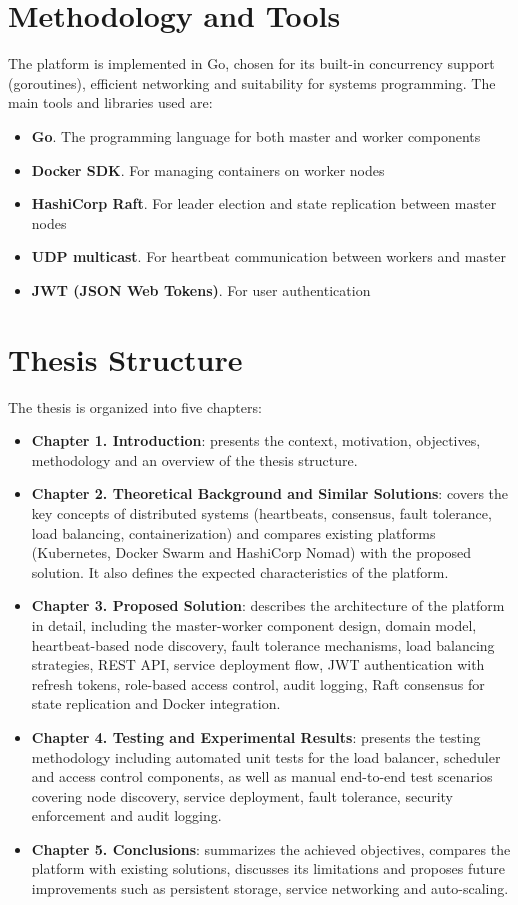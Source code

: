 \section{Methodology and Tools}

The platform is implemented in Go, chosen for its built-in concurrency support (goroutines), efficient networking and suitability for systems programming. The main tools and libraries used are:

\begin{itemize}
    \item \textbf{Go}. The programming language for both master and worker components
    \item \textbf{Docker SDK}. For managing containers on worker nodes
    \item \textbf{HashiCorp Raft}. For leader election and state replication between master nodes
    \item \textbf{UDP multicast}. For heartbeat communication between workers and master
    \item \textbf{JWT (JSON Web Tokens)}. For user authentication
\end{itemize}

\section{Thesis Structure}

The thesis is organized into five chapters:

\begin{itemize}
    \item \textbf{Chapter 1. Introduction}: presents the context, motivation, objectives, methodology and an overview of the thesis structure.
    \item \textbf{Chapter 2. Theoretical Background and Similar Solutions}: covers the key concepts of distributed systems (heartbeats, consensus, fault tolerance, load balancing, containerization) and compares existing platforms (Kubernetes, Docker Swarm and HashiCorp Nomad) with the proposed solution. It also defines the expected characteristics of the platform.
    \item \textbf{Chapter 3. Proposed Solution}: describes the architecture of the platform in detail, including the master-worker component design, domain model, heartbeat-based node discovery, fault tolerance mechanisms, load balancing strategies, REST API, service deployment flow, JWT authentication with refresh tokens, role-based access control, audit logging, Raft consensus for state replication and Docker integration.
    \item \textbf{Chapter 4. Testing and Experimental Results}: presents the testing methodology including automated unit tests for the load balancer, scheduler and access control components, as well as manual end-to-end test scenarios covering node discovery, service deployment, fault tolerance, security enforcement and audit logging.
    \item \textbf{Chapter 5. Conclusions}: summarizes the achieved objectives, compares the platform with existing solutions, discusses its limitations and proposes future improvements such as persistent storage, service networking and auto-scaling.
\end{itemize}